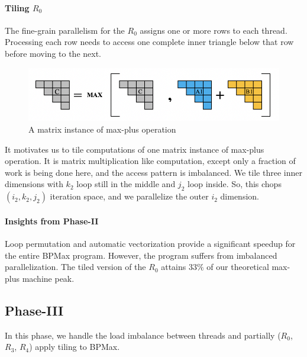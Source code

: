 \paragraph{Tiling $R_{0}$} 
The fine-grain parallelism for the $R_{0}$ assigns one or more rows to each thread. Processing each row needs to access one complete inner triangle below that row before moving to the next.  
\begin{figure}[htbp]
\begin{adjustbox}{varwidth=\textwidth,margin=0 {\abovecaptionskip} 0 0, frame=0.00pt}
\centerline{\includegraphics[scale=.57]{single_max_plus_operation.png}}
\end{adjustbox}
\caption{A matrix instance of max-plus operation}
\label{fig:matrix_instance_max_plus}
\end{figure}
It motivates us to tile computations of one matrix instance of max-plus operation. It is matrix multiplication like computation, except only a fraction of work is being done here, and the access pattern is imbalanced. We tile three inner dimensions with $k_{2}$ loop still in the middle and $j_{2}$ loop inside. So, this chops $(i_{2}, k_{2}, j_{2})$ iteration space, and we parallelize the outer $i_{2}$ dimension.

 \paragraph{Insights from Phase-II} 
Loop permutation and automatic vectorization provide a significant speedup for the entire BPMax program. However, the program suffers from imbalanced parallelization. The tiled version of the $R_{0}$ attains $33\%$ of our theoretical max-plus machine peak.

\subsection{Phase-III}
In this phase, we handle the load imbalance between threads and partially ($R_{0}$, $R_{3}$, $R_{4}$) apply tiling to BPMax.

